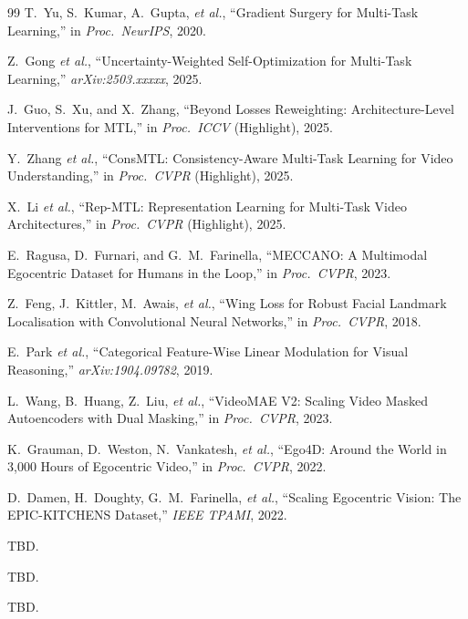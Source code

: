 \documentclass[10pt,twocolumn]{article}
\begin{document}
\begin{thebibliography}{99}
T.~Yu, S.~Kumar, A.~Gupta, \emph{et al.},
``Gradient Surgery for Multi-Task Learning,''
in \emph{Proc.\ NeurIPS}, 2020.

Z.~Gong \emph{et al.},
``Uncertainty-Weighted Self-Optimization for Multi-Task Learning,''
\emph{arXiv:2503.xxxxx}, 2025.

J.~Guo, S.~Xu, and X.~Zhang,
``Beyond Losses Reweighting: Architecture-Level Interventions for MTL,''
in \emph{Proc.\ ICCV} (Highlight), 2025.

Y.~Zhang \emph{et al.},
``ConsMTL: Consistency-Aware Multi-Task Learning for Video Understanding,''
in \emph{Proc.\ CVPR} (Highlight), 2025.

X.~Li \emph{et al.},
``Rep-MTL: Representation Learning for Multi-Task Video Architectures,''
in \emph{Proc.\ CVPR} (Highlight), 2025.

E.~Ragusa, D.~Furnari, and G.~M.~Farinella,
``MECCANO: A Multimodal Egocentric Dataset for Humans in the Loop,''
in \emph{Proc.\ CVPR}, 2023.

Z.~Feng, J.~Kittler, M.~Awais, \emph{et al.},
``Wing Loss for Robust Facial Landmark Localisation with Convolutional Neural Networks,''
in \emph{Proc.\ CVPR}, 2018.

E.~Park \emph{et al.},
``Categorical Feature-Wise Linear Modulation for Visual Reasoning,''
\emph{arXiv:1904.09782}, 2019.

L.~Wang, B.~Huang, Z.~Liu, \emph{et al.},
``VideoMAE V2: Scaling Video Masked Autoencoders with Dual Masking,''
in \emph{Proc.\ CVPR}, 2023.

K.~Grauman, D.~Weston, N.~Vankatesh, \emph{et al.},
``Ego4D: Around the World in 3,000 Hours of Egocentric Video,''
in \emph{Proc.\ CVPR}, 2022.

D.~Damen, H.~Doughty, G.~M.~Farinella, \emph{et al.},
``Scaling Egocentric Vision: The EPIC-KITCHENS Dataset,''
\emph{IEEE TPAMI}, 2022.

TBD.

TBD.

TBD.

\end{thebibliography}
\end{document}
